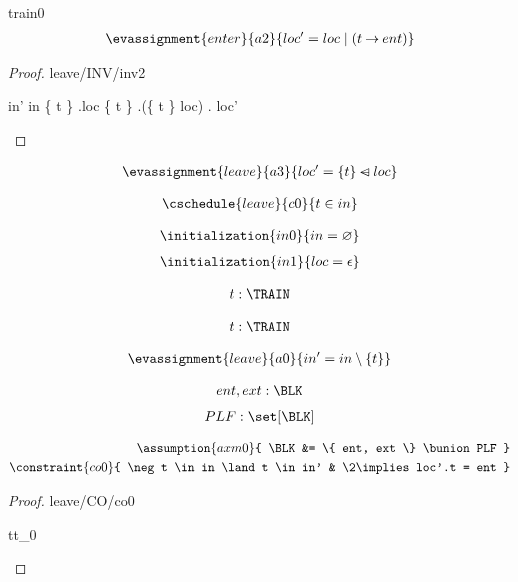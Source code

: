 \documentclass[12pt]{amsart}
\begin{document}
\begin{machine}{train0}
\begin{align*}
\evassignment{enter}{a2}
{	loc' = loc  \1| (t \tfun ent)	}
\end{align*}

\begin{proof}{leave/INV/inv2}
	\begin{calculation}
		in'
	\hint{=}{ \ref{a0} }
		in \setminus \{ t \}
	\hint{=}{ \ref{inv2} }
		\dom.loc \setminus \{ t \}
		\dom.(\{ t \} \domsub loc)
	\hint{=}{ \ref{a3} } 
		\dom. loc' 
	\end{calculation}
\end{proof}

\begin{align*}
\evassignment{leave}{a3}
{	loc' = \{ t \} \domsub loc 	}
\end{align*}

\begin{align*}
\cschedule{leave}{c0}
{	t \in in}
\end{align*}

\begin{align*}
\initialization{in0}
{	in = \emptyset	}
\end{align*}
\begin{align*}
\initialization{in1}
{	loc = \emptyfun	}
\end{align*}


\begin{align*}
\indices{leave}{	t: \TRAIN}
\end{align*}

\begin{align*}
\indices{enter}{	t: \TRAIN}
\end{align*}

\begin{align*}
\evassignment{leave}{a0}
{	in' = in \setminus \{ t \}	}
\end{align*}

\begin{align*}
\constant{	ent,ext : \BLK}
\end{align*}
\begin{align*}
\constant{	PLF : \set [\BLK]}
\end{align*}

\begin{align*}
\assumption{axm0}
{	\BLK &= \{ ent, ext \} \bunion PLF	} \\
\constraint{co0}
{	\neg t \in in \land t \in in' & \2\implies  loc'.t = ent } %
\end{align*}
%
\begin{proof}{leave/CO/co0}
	\begin{free:var}{t}{t_0}
	

\end{free:var}
\end{proof}
\end{machine}
\end{document}
